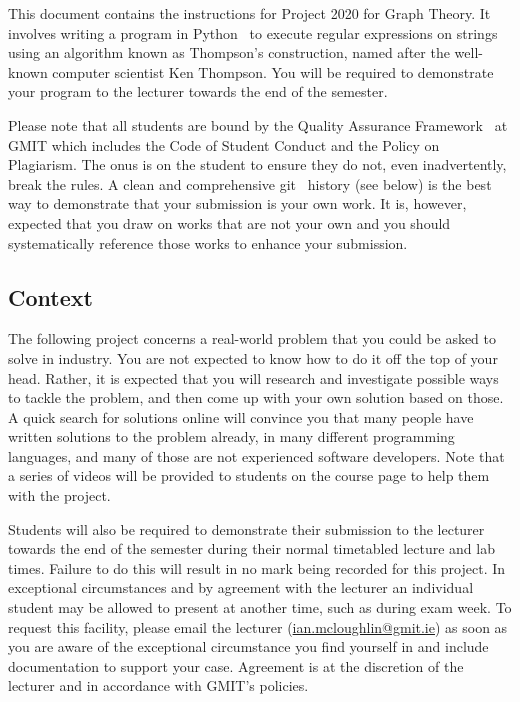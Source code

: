\documentclass[12pt, a4paper]{article}
\title{\projectname}
\author{\modulename}
\date{Due: \duedate}
\newcommand{\modulename}{Graph Theory}
\newcommand{\projectyear}{2020}
\newcommand{\projectname}{Project \projectyear}
\begin{document}
\maketitle

\noindent
This document contains the instructions for \projectname{} for \modulename{}.
It involves writing a program in Python~\cite{python} to execute regular expressions on strings using an algorithm known as Thompson's construction, named after the well-known computer scientist Ken Thompson.
You will be required to demonstrate your program to the lecturer towards the end of the semester.

Please note that all students are bound by the Quality Assurance Framework~\cite{gmitqaf} at GMIT which includes the Code of Student Conduct and the Policy on Plagiarism.
The onus is on the student to ensure they do not, even inadvertently, break the rules.
A clean and comprehensive git~\cite{git} history (see below) is the best way to demonstrate that your submission is your own work.
It is, however, expected that you draw on works that are not your own and you should systematically reference those works to enhance your submission.

\subsection*{Context}
The following project concerns a real-world problem that you could be asked to solve in industry.
You are not expected to know how to do it off the top of your head.
Rather, it is expected that you will research and investigate possible ways to tackle the problem, and then come up with your own solution based on those.
A quick search for solutions online will convince you that many people have written solutions to the problem already, in many different programming languages, and many of those are not experienced software developers.
Note that a series of videos will be provided to students on the course page to help them with the project.

Students will also be required to demonstrate their submission to the lecturer towards the end of the semester during their normal timetabled lecture and lab times.
Failure to do this will result in no mark being recorded for this project.
In exceptional circumstances and by agreement with the lecturer an individual student may be allowed to present at another time, such as during exam week.
To request this facility, please email the lecturer (\url{ian.mcloughlin@gmit.ie}) as soon as you are aware of the exceptional circumstance you find yourself in and include documentation to support your case.
Agreement is at the discretion of the lecturer and in accordance with GMIT's policies.
\end{document}
